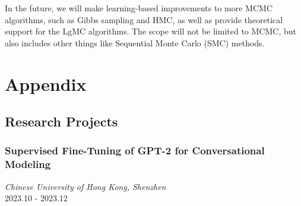 \documentclass[twocolumn]{article}
\begin{document}
In the future, we will make learning-based improvements to more MCMC algorithms, such as Gibbs sampling and HMC, as well as provide theoretical support for the LgMC algorithms. The scope will not be limited to MCMC, but also includes other things like Sequential Monte Carlo (SMC) methods.





%



\section{Appendix}

\subsection{Research Projects}

\subsubsection{Supervised Fine-Tuning of GPT-2 for Conversational Modeling}
\textit{Chinese University of Hong Kong, Shenzhen} \\
2023.10 - 2023.12 \\
\end{document}
